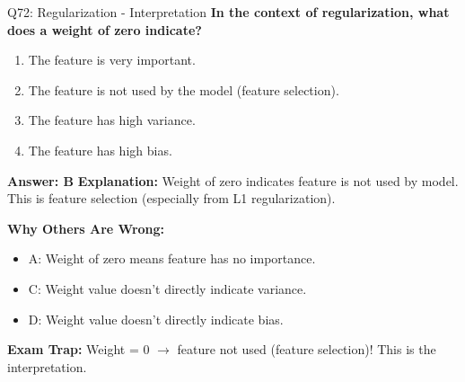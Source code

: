 \documentclass[8pt]{beamer}
\begin{document}
	\begin{frame}{Q72: Regularization - Interpretation}
		\fontsize{6.5}{7.5}\selectfont
		\textbf{In the context of regularization, what does a weight of zero indicate?}
		
		\begin{enumerate}
			\item The feature is very important.
			\item The feature is not used by the model (feature selection).
			\item The feature has high variance.
			\item The feature has high bias.
		\end{enumerate}
		
		\vspace{0.05cm}
		\textcolor{myblue}{\textbf{Answer: B}}
		\vspace{0.05cm}
		\textcolor{myblue}{\textbf{Explanation:}} Weight of zero indicates feature is not used by model. This is feature selection (especially from L1 regularization).
		
		\vspace{0.05cm}
		\textcolor{myred}{\textbf{Why Others Are Wrong:}}
		\begin{itemize}
			\item \textcolor{myred}{A:} Weight of zero means feature has no importance.
			\item \textcolor{myred}{C:} Weight value doesn't directly indicate variance.
			\item \textcolor{myred}{D:} Weight value doesn't directly indicate bias.
		\end{itemize}
		
		\textcolor{myred}{\textbf{Exam Trap:}} Weight = 0 $\rightarrow$ \textcolor{myblue}{feature not used} (feature selection)! This is the interpretation.
	\end{frame}
	
\end{document}
